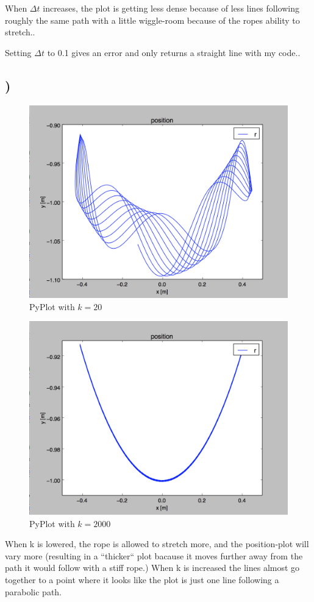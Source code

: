 \documentclass[a4paper,10pt,norsk]{article}
\begin{document}
When $\Delta t$ increases, the plot is getting less dense because of less lines following roughly the same path with a little wiggle-room because of the ropes ability to stretch..

Setting $\Delta t$ to 0.1 gives an error and only returns a straight line with my code..
 
 \subsection{)}
 \begin{figure}[h!]
        \centering 
        \includegraphics[scale=0.4]{oppg_l_20.png} 
        \caption{PyPlot with $k = 20$}
\end{figure}
\begin{figure}[h!]
        \centering 
        \includegraphics[scale=0.4]{oppg_l_2000.png} 
        \caption{PyPlot with $k = 2000$}
\end{figure}
 When k is lowered, the rope is allowed to stretch more, and the position-plot will vary more (resulting in a ``thicker`` plot bacause it moves further away from the path it would follow with a stiff rope.)
 When k is increased the lines almost go together to a point where it looks like the plot is just one line following a parabolic path.
 
\end{document}
